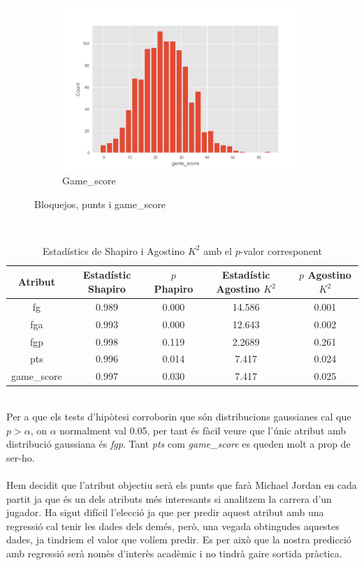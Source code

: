 \documentclass{article}
\begin{document}
\begin{figure}[!h]
\begin{subfigure}[b]{0.25\textwidth}
		\includegraphics[width=\textwidth]{hist24}
		\caption*{Game\_score}
		\label{fig:hist24}
	\end{subfigure}
	\caption{Bloquejos, punts i game\_score}
	\label{fig:hist20}
\end{figure}
\\
\begin{table}[h!]
	\begin{center}
		\begin{tabular}{| c | c | c | c | c |}\hline
			Atribut & Estadístic Shapiro & $p$ Phapiro & Estadístic Agostino $K^2$ & $p$ Agostino $K^2$ \\ \hline
			fg & 0.989 & 0.000 & 14.586 & 0.001 \\ \hline
			fga & 0.993 & 0.000 & 12.643 & 0.002 \\ \hline
			fgp & 0.998 & 0.119 & 2.2689 & 0.261 \\ \hline
			pts & 0.996 & 0.014 & 7.417 & 0.024 \\ \hline
			game\_score & 0.997 & 0.030 & 7.417 & 0.025 \\ \hline
		\end{tabular}
		\caption{Estadístics de Shapiro i Agostino $K^2$ amb el $p$-valor corresponent}
		\label{tab:fruta}
	\end{center}
\end{table}
\\
Per a que els tests d'hipòtesi corroborin que són distribucions gaussianes cal que $p>\alpha$, on $\alpha$ normalment val 0.05, per tant és fàcil veure que l'únic atribut amb distribució gaussiana és \textit{fgp}. Tant \textit{pts} com \textit{game\_score} es queden molt a prop de ser-ho.
\\
\\
Hem decidit que l'atribut objectiu serà els punts que farà Michael Jordan en cada partit ja que és un dels atributs més interesants si analitzem la carrera d'un jugador. Ha sigut difícil l'elecció ja que per predir aquest atribut amb una regressió cal tenir les dades dels demés, però, una vegada obtingudes aquestes dades, ja tindriem el valor que volíem predir. Es per això que la nostra predicció amb regressió serà nomès d'interès acadèmic i no tindrà gaire sortida pràctica.
\newpage
\end{document}
